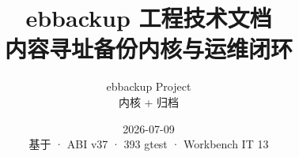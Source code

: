 \documentclass[12pt,a4paper,openany]{ctexbook}
\title{ebbackup 工程技术文档\\[0.4em]\large 内容寻址备份内核与运维闭环}
\author{ebbackup Project\\\filepath{engine\_cpp/} 内核 + \filepath{docs/} 归档}
\date{2026-07-09\\{\small 基于 \versiontag{0.10.3} · ABI v37 · 393 gtest · Workbench IT 13}}
\begin{document}
\frontmatter
\maketitle

\tableofcontents
\listoffigures
\listoftables
\lstlistoflistings

\mainmatter


























\appendix


\backmatter
\end{document}
